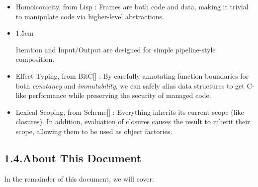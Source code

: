 \documentclass[preprint]{{sigplanconf}}
\begin{document}
\begin{itemize}[noitemsep,topsep=\mdcompacttopsep]%

\item{}Homoiconicity, from Lisp : Frames are both code and data, making it
trivial to manipulate code via higher-level abstractions.%

\item{}
\begin{mddefinitions}%


\begin{mdbmarginx}{}{}{}{1.5em}%
\begin{mddefdata}%
Iteration and Input/Output are designed for simple pipeline-style composition.%
\end{mddefdata}%
\end{mdbmarginx}%
\end{mddefinitions}%

\item{}Effect Typing, from BitC[] : By carefully annotating function
boundaries for both \emph{constancy} and \emph{immutability}, we can safely alias
data structures to get C-like performance while preserving the security
of managed code.%

\item{}Lexical Scoping, from Scheme[] : Everything inherits its current
scope (like closures). In addition, evaluation of closures causes the
result to inherit their scope, allowing them to be used as object
factories.%
\end{itemize}%

\subsection{1.4.\hspace*{0.5em}About This Document}\label{sec-about-this-document}%

\noindent{}In the remainder of this document, we will cover:%
\end{document}
